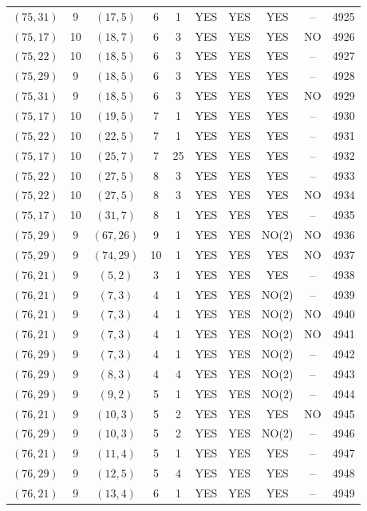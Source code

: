 \begin{longtable}{|c|c|c|c|c|c|c|c|c|c|}
$(75, 31)$ & 9 & $(17, 5)$ & 6 & 1 & YES & YES & YES & -- & 4925\\
$(75, 17)$ & 10 & $(18, 7)$ & 6 & 3 & YES & YES & YES & NO & 4926\\
$(75, 22)$ & 10 & $(18, 5)$ & 6 & 3 & YES & YES & YES & -- & 4927\\
$(75, 29)$ & 9 & $(18, 5)$ & 6 & 3 & YES & YES & YES & -- & 4928\\
$(75, 31)$ & 9 & $(18, 5)$ & 6 & 3 & YES & YES & YES & NO & 4929\\
$(75, 17)$ & 10 & $(19, 5)$ & 7 & 1 & YES & YES & YES & -- & 4930\\
$(75, 22)$ & 10 & $(22, 5)$ & 7 & 1 & YES & YES & YES & -- & 4931\\
$(75, 17)$ & 10 & $(25, 7)$ & 7 & 25 & YES & YES & YES & -- & 4932\\
$(75, 22)$ & 10 & $(27, 5)$ & 8 & 3 & YES & YES & YES & -- & 4933\\
$(75, 22)$ & 10 & $(27, 5)$ & 8 & 3 & YES & YES & YES & NO & 4934\\
$(75, 17)$ & 10 & $(31, 7)$ & 8 & 1 & YES & YES & YES & -- & 4935\\
$(75, 29)$ & 9 & $(67, 26)$ & 9 & 1 & YES & YES & NO(2) & NO & 4936\\
$(75, 29)$ & 9 & $(74, 29)$ & 10 & 1 & YES & YES & YES & NO & 4937\\
$(76, 21)$ & 9 & $(5, 2)$ & 3 & 1 & YES & YES & YES & -- & 4938\\
$(76, 21)$ & 9 & $(7, 3)$ & 4 & 1 & YES & YES & NO(2) & -- & 4939\\
$(76, 21)$ & 9 & $(7, 3)$ & 4 & 1 & YES & YES & NO(2) & NO & 4940\\
$(76, 21)$ & 9 & $(7, 3)$ & 4 & 1 & YES & YES & NO(2) & NO & 4941\\
$(76, 29)$ & 9 & $(7, 3)$ & 4 & 1 & YES & YES & NO(2) & -- & 4942\\
$(76, 29)$ & 9 & $(8, 3)$ & 4 & 4 & YES & YES & NO(2) & -- & 4943\\
$(76, 29)$ & 9 & $(9, 2)$ & 5 & 1 & YES & YES & NO(2) & -- & 4944\\
$(76, 21)$ & 9 & $(10, 3)$ & 5 & 2 & YES & YES & YES & NO & 4945\\
$(76, 29)$ & 9 & $(10, 3)$ & 5 & 2 & YES & YES & NO(2) & -- & 4946\\
$(76, 21)$ & 9 & $(11, 4)$ & 5 & 1 & YES & YES & YES & -- & 4947\\
$(76, 29)$ & 9 & $(12, 5)$ & 5 & 4 & YES & YES & YES & -- & 4948\\
$(76, 21)$ & 9 & $(13, 4)$ & 6 & 1 & YES & YES & YES & -- & 4949\\

\end{longtable}
